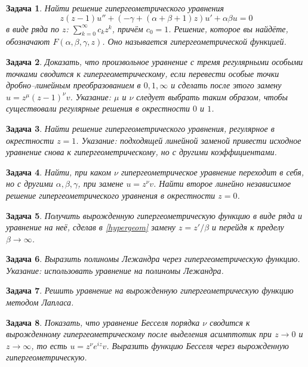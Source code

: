 \documentclass{article}
\newtheorem{problem}{Задача}
\begin{document}
\begin{problem}
    Найти решение гипергеометрического уравнения
    \begin{equation}
        \label{hypergeom}
        z(z-1)u'' + (-\gamma + (\alpha + \beta + 1)z)u' + \alpha \beta u = 0
    \end{equation}
    в виде ряда по $z$: $\sum_{k=0}^{\infty} c_k z^k$, причём $c_0 = 1$. Решение, которое 
    вы найдёте, обозначают $F(\alpha, \beta, \gamma, z)$. Оно называется
    гипергеометрической функцией.
\end{problem}
\begin{problem}
    Доказать, что произвольное уравнение с тремя регулярными особыми точками
    сводится к гипергеометрическому, если перевести особые точки
    дробно--линейным преобразованием в $0,1, \infty$ и сделать после этого замену 
    $u = z^\mu (z-1)^\nu v$. \emph{Указание:} $\mu$ и $\nu$ следует выбрать таким образом,
    чтобы существовали регулярные решения в окрестности $0$ и $1$.
\end{problem}    
\begin{problem}
    Найти решение гипергеометрического уравнения, регулярное в окрестности $z = 1$.
    \emph{Указание:} подходящей линейной заменой привести исходное уравнение снова к 
    гипергеометрическому, но с другими коэффициентами.
\end{problem}
\begin{problem}
    Найти, при каком $\nu$ гипергеометрическое уравнение переходит в себя, но с другими
    $\alpha, \beta, \gamma$, при замене $u = z^\nu v$. Найти второе линейно независимое
    решение гипергеометрического уравнения в окрестности $z = 0$.
\end{problem}
\begin{problem}
    Получить вырожденную гипергеометрическую функцию в виде ряда 
    и уравнение на неё, сделав в    
    \eqref{hypergeom} замену $z = z'/\beta$ и перейдя к пределу $\beta \to \infty$.
\end{problem}
\begin{problem}
    Выразить полиномы Лежандра через гипергеометрическую функцию. \emph{Указание}: использовать
    уравнение на полиномы Лежандра.
\end{problem}
\begin{problem}
    Решить уравнение на вырожденную гипергеометрическую функцию методом Лапласа.
\end{problem}
\begin{problem}
    Показать, что уравнение Бесселя порядка $\nu$ сводится к вырожденному
    гипергеометрическому после 
    выделения асимптотик при $z\to 0$ и $z \to \infty$, то есть $u = z^\nu e^{iz} v$. Выразить
    функцию Бесселя через вырожденную гипергеометрическую.
\end{problem}
\end{document}
